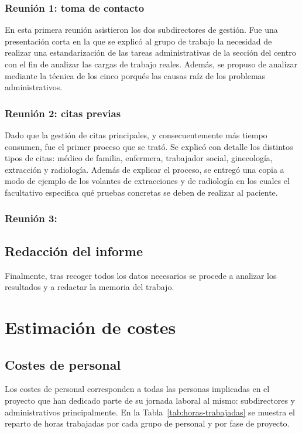 \subsubsection{Reunión 1: toma de contacto}

En esta primera reunión asistieron los dos subdirectores de gestión. Fue una presentación corta en la que se explicó al grupo de trabajo la necesidad de realizar una estandarización de las tareas administrativas de la sección del centro con el fin de analizar las cargas de trabajo reales. Además, se propuso de analizar mediante la técnica de los cinco porqués las causas raíz de los problemas administrativos.

\subsubsection{Reunión 2: citas previas}

Dado que la gestión de citas principales, y consecuentemente más tiempo consumen, fue el primer proceso que se trató. Se explicó con detalle los distintos tipos de citas: médico de familia, enfermera, trabajador social, ginecología, extracción y radiología. Además de explicar el proceso, se entregó una copia a modo de ejemplo de los volantes de extracciones y de radiología en los cuales el facultativo especifica qué pruebas concretas se deben de realizar al paciente.

\subsubsection{Reunión 3: }

\subsection{Redacción del informe}

Finalmente, tras recoger todos los datos necesarios se procede a analizar los resultados y a redactar la memoria del trabajo.

\section{Estimación de costes}


\subsection{Costes de personal}

Los costes de personal corresponden a todas las personas implicadas en el proyecto que han dedicado parte de su jornada laboral al mismo: subdirectores y administrativos principalmente.
En la Tabla~\ref{tab:horas-trabajadas} se muestra el reparto de horas trabajadas por cada grupo de personal y por fase de proyecto.

